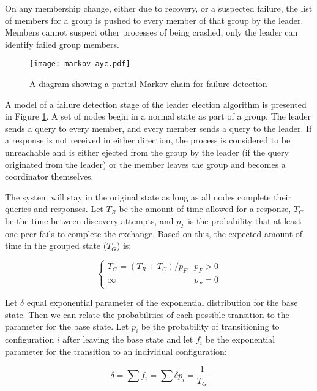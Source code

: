 On any membership change, either due to recovery, or a suspected failure, the 
list of members for a group is pushed to every member of that group by the 
leader. Members cannot suspect other processes of being crashed, only the 
leader can identify failed group members.

\begin{figure}[!h]
\centering
\texttt{[image: markov-ayc.pdf]}
\captionsetup{singlelinecheck=off}
\caption{A diagram showing a partial Markov chain for failure detection}

\label{fig:MARKOVAYC}
\end{figure}

A model of a failure detection stage of the leader election algorithm is presented in
Figure \ref{fig:MARKOVAYC}. A set of nodes begin in a normal state as part of a group.
The leader sends a query to every member, and every member sends a query to the leader.
If a response is not received in either direction, the process is considered to be 
unreachable and is either ejected from the group by the leader (if the query originated from the leader)
or the member leaves the group and becomes a coordinator themselves. 

The system will stay in the original state as long as all nodes complete their queries and responses.
Let $T_{R}$ be the amount of time allowed for a response, $T_{C}$ be the time between
discovery attempts, and $p_{F}$ is the probability that at least one peer fails to complete the exchange.
Based on this, the expected amount of time in the grouped state ($T_{G}$) is:

\begin{equation}
\begin{cases}
T_{G} = ( T_{R}+T_{C}  ) / p_{F} & p_{F} > 0 \\
\infty & p_{F} = 0
\end{cases}
\end{equation}

Let $\delta$ equal exponential parameter of the exponential distribution for the base state. Then
we can relate the probabilities of each possible transition to the parameter for the base state. Let
$p_{i}$ be the probability of transitioning to configuration $i$ after leaving the base state and let
$f_{i}$ be the exponential parameter for the transition to an individual configuration:

\begin{equation}
\delta = \sum f_{i} = \sum \delta p_{i} = \frac{1}{T_{G}}
\end{equation}

